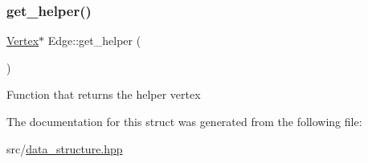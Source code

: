 \subsubsection{\texorpdfstring{get\+\_\+helper()}{get\_helper()}}
{\footnotesize\ttfamily \hyperlink{structVertex}{Vertex}$\ast$ Edge\+::get\+\_\+helper (\begin{DoxyParamCaption}{ }\end{DoxyParamCaption})\hspace{0.3cm}{\ttfamily [inline]}}

Function that returns the helper vertex 

The documentation for this struct was generated from the following file\+:\begin{DoxyCompactItemize}
\item 
src/\hyperlink{data__structure_8hpp}{data\+\_\+structure.\+hpp}\end{DoxyCompactItemize}
